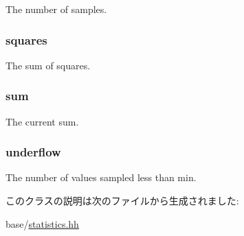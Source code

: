 The number of samples. \hypertarget{classStats_1_1DistStor_a0c02ec1e072d692448ce4429a78e3675}{
\subsubsection[{squares}]{ {\bf squares}}}
\label{classStats_1_1DistStor_a0c02ec1e072d692448ce4429a78e3675}
The sum of squares. \hypertarget{classStats_1_1DistStor_ab5b201cce7e10c48f62b71605e75707e}{
\subsubsection[{sum}]{ {\bf sum}}}
\label{classStats_1_1DistStor_ab5b201cce7e10c48f62b71605e75707e}
The current sum. \hypertarget{classStats_1_1DistStor_af9e29e4a48415bdab1a3273284c1f7d2}{
\subsubsection[{underflow}]{ {\bf underflow}}}
\label{classStats_1_1DistStor_af9e29e4a48415bdab1a3273284c1f7d2}
The number of values sampled less than min. 

このクラスの説明は次のファイルから生成されました:\begin{DoxyCompactItemize}
\item 
base/\hyperlink{statistics_8hh}{statistics.hh}\end{DoxyCompactItemize}
